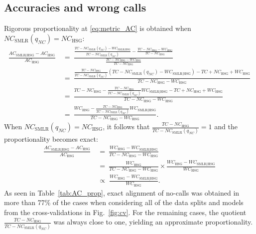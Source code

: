 \documentclass[preprint,5p,times,11pt]{elsarticle}
\begin{document}
\subsection*{Accuracies and wrong calls}
Rigorous proportionality at \eqref{eq:metric_AC} is obtained when $NC_{\text{SMLR}}(q_{NC}) = NC_{\text{HSG}}$:
\begin{align*}
\frac{AC_{\text{SMLR}\mid\text{HSG}} - AC_{\text{HSG}}}{AC_{\text{HSG}}}
\ &= \ 
\frac{\frac{TC - NC_{\text{SMLR}}(q_{NC}) - WC_{\text{SMLR}\mid\text{HSG}}}{TC - NC_{\text{SMLR}}(q_{NC})} - \frac{TC - NC_{\text{HSG}} - WC_{\text{HSG}}}{TC - NC_{\text{HSG}}}}{\frac{TC - NC_{\text{HSG}} - WC_{\text{HSG}}}{TC - NC_{\text{HSG}}}} \\
\ &= \ 
\frac{\frac{TC - NC_{\text{HSG}}}{TC - NC_{\text{SMLR}}(q_{NC})} \left(TC - NC_{\text{SMLR}}(q_{NC}) - WC_{\text{SMLR}\mid\text{HSG}}\right) - TC + NC_{\text{HSG}} + WC_{\text{HSG}}}{TC - NC_{\text{HSG}} - WC_{\text{HSG}}} \\
\ &= \ 
\frac{TC - NC_{\text{HSG}} - \frac{TC - NC_{\text{HSG}}}{TC - NC_{\text{SMLR}}(q_{NC})} WC_{\text{SMLR}\mid\text{HSG}} - TC + NC_{\text{HSG}} + WC_{\text{HSG}}}{TC - NC_{\text{HSG}} - WC_{\text{HSG}}} \\
\ &= \ 
\frac{WC_{\text{HSG}} - \frac{TC - NC_{\text{HSG}}}{TC - NC_{\text{SMLR}}(q_{NC})} WC_{\text{SMLR}\mid\text{HSG}}}{TC - NC_{\text{HSG}} - WC_{\text{HSG}}}.
\end{align*}
When $NC_{\text{SMLR}}(q_{NC}) = NC_{\text{HSG}}$, it follows that $\frac{TC - NC_{\text{HSG}}}{TC - NC_{\text{SMLR}}(q_{NC})} = 1$ and the proportionality becomes exact:
\begin{align}
\frac{AC_{\text{SMLR}\mid\text{HSG}} - AC_{\text{HSG}}}{AC_{\text{HSG}}}
\ &= \ 
\frac{WC_{\text{HSG}} - WC_{\text{SMLR}\mid\text{HSG}}}{TC - NC_{\text{HSG}} - WC_{\text{HSG}}} \nonumber\\
\ &= \ 
\frac{WC_{\text{HSG}}}{TC - NC_{\text{HSG}} - WC_{\text{HSG}}} \times \frac{WC_{\text{HSG}} - WC_{\text{SMLR}\mid\text{HSG}}}{WC_{\text{HSG}}} \nonumber\\
\; &\propto \; 
\frac{WC_{\text{HSG}} - WC_{\text{SMLR}\mid\text{HSG}}}{WC_{\text{HSG}}}.\label{eq:prop_AC}
\end{align}
As seen in Table~\ref{tab:AC_prop}, exact alignment of no-calls was obtained in more than 77\% of the cases when considering all of the data splits and models from the cross-validations in Fig.~\ref{fig:cv}.
For the remaining cases, the quotient $\frac{TC - NC_{\text{HSG}}}{TC - NC_{\text{SMLR}}(q_{NC})}$ was always close to one, yielding an approximate proportionality.
\end{document}
